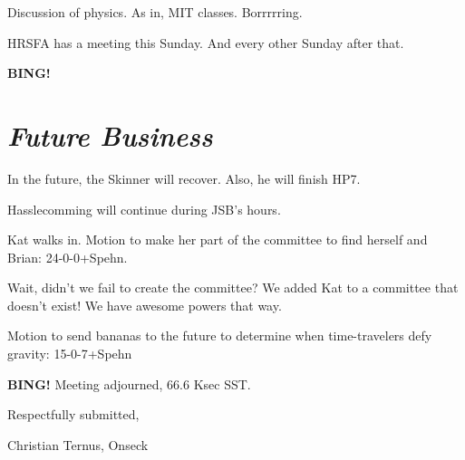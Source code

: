 \documentclass[10pt]{article}
\newcommand{\bing}{{\bf BING!} }
\newcommand{\goto}[1]{\bing \vskip 12pt \section*{{\em{#1}}}}
\begin{document}
Discussion of physics.  As in, MIT classes.  Borrrrring.

HRSFA has a meeting this Sunday.  And every other Sunday after that.

\goto{Future Business}

In the future, the Skinner will recover.  Also, he will finish HP7.

Hasslecomming will continue during JSB's hours.

Kat walks in.  Motion to make her part of the committee to find herself and Brian: 24-0-0+Spehn.

Wait, didn't we fail to create the committee?  We added Kat to a committee that doesn't exist!  We have awesome powers that way.

Motion to send bananas to the future to determine when time-travelers defy gravity: 15-0-7+Spehn

\bing
\noindent
Meeting adjourned, 66.6 Ksec SST.

\vspace{18pt}

\centerline{Respectfully submitted,}
\centerline{Christian Ternus, Onseck}
\end{document}
